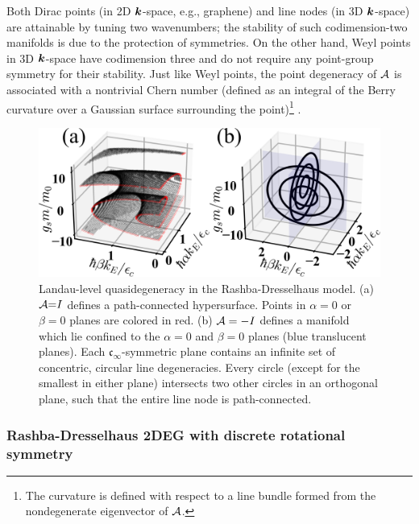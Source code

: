 \documentclass[aps, showpacs, twocolumn, notitlepage, superscriptaddress]{revtex4-1}
\begin{document}
 Both Dirac points (in 2D $\boldsymbol{k}$-space, e.g., graphene\cite{neto2009electronic}) and line nodes (in 3D $\boldsymbol{k}$-space) are attainable by tuning two wavenumbers; the stability of such codimension-two manifolds is due to the protection of symmetries. On the other hand, Weyl points in 3D $\boldsymbol{k}$-space have codimension three and do not require any point-group symmetry for their stability. Just like Weyl points, the point degeneracy of ${\cal A}$ is associated with a nontrivial Chern number\cite{TKNN} (defined as an integral of the Berry curvature\cite{berry_quantal_1984} over a Gaussian surface surrounding the point)\footnote{The curvature is defined with respect to a line bundle formed from the nondegenerate eigenvector of ${\cal A}$.} .


\begin{figure}
\includegraphics[width=1.0\columnwidth]{dgn.png}
\caption{Landau-level quasidegeneracy in the Rashba-Dresselhaus model. (a)  ${\cal A}{=}I$ defines a path-connected hypersurface. Points in $\alpha=0$ or $\beta=0$ planes are colored in red. (b)  ${\cal A}=-I$ defines a manifold which lie confined to  the $\alpha{=}0$ and $\beta{=}0$ planes (blue translucent planes). Each $\mathfrak{c}_{\infty}$-symmetric plane contains an infinite set of concentric, circular line degeneracies. Every circle (except for the smallest in either plane)  intersects two other circles in an orthogonal plane, such that the entire line node is path-connected. \label{fig:dgn}}
\end{figure}

\subsubsection{Rashba-Dresselhaus 2DEG with discrete rotational symmetry}\label{sec:disrot}
\end{document}
